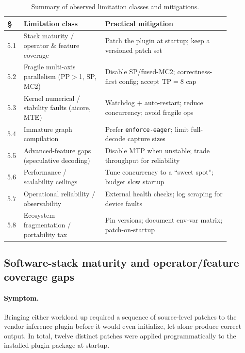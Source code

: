 \documentclass{article}
\newcommand{\code}[1]{\texttt{#1}}
\begin{document}
\begin{table}[t]
\centering
\caption{Summary of observed limitation classes and mitigations.}
\label{tab:summary}
\small
\begin{tabular}{@{}p{0.05\linewidth}p{0.34\linewidth}p{0.52\linewidth}@{}}
\toprule
\textbf{\S} & \textbf{Limitation class} & \textbf{Practical mitigation} \\
\midrule
5.1 & Stack maturity / operator \& feature coverage & Patch the plugin at startup; keep a versioned patch set \\
5.2 & Fragile multi-axis parallelism (PP$>$1, SP, MC2) & Disable SP/fused-MC2; correctness-first config; accept TP$=$8 cap \\
5.3 & Kernel numerical / stability faults (aicore, MTE) & Watchdog + auto-restart; reduce concurrency; avoid fragile ops \\
5.4 & Immature graph compilation & Prefer \code{enforce-eager}; limit full-decode capture sizes \\
5.5 & Advanced-feature gaps (speculative decoding) & Disable MTP when unstable; trade throughput for reliability \\
5.6 & Performance / scalability ceilings & Tune concurrency to a ``sweet spot''; budget slow startup \\
5.7 & Operational reliability / observability & External health checks; log scraping for device faults \\
5.8 & Ecosystem fragmentation / portability tax & Pin versions; document env-var matrix; patch-on-startup \\
\bottomrule
\end{tabular}
\end{table}

\subsection{Software-stack maturity and operator/feature coverage gaps}
\label{sec:maturity}
\paragraph{Symptom.} Bringing either workload up required a sequence of
source-level patches to the vendor inference plugin before it would even
initialize, let alone produce correct output. In total, twelve distinct patches
were applied programmatically to the installed plugin package at startup.
\end{document}
